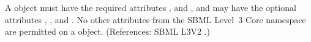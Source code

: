 A \Reaction object must have the required attributes ,
 and  , and may have the optional attributes
, ,  and .  No
other attributes from the SBML Level~3 Core namespace are permitted on a
\Reaction object.  (References: SBML L3V2 .)
